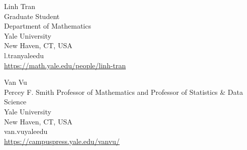 \documentclass{toc}
\begin{document}
			
			
			
			
			\begin{tocauthors}
				\begin{tocinfo}[tran]
					Linh Tran\\
					Graduate Student\\
					Department of Mathematics\\
					Yale University\\
					New Haven, CT, USA\\
					l.tran\tocat{}yale\tocdot{}edu \\   %
					\url{https://math.yale.edu/people/linh-tran}      %
				\end{tocinfo}
				\begin{tocinfo}[vu]
					Van Vu\\
					Percey F. Smith Professor of Mathematics and Professor of Statistics \& Data Science\\
					Yale University\\
					New Haven, CT, USA\\
					van.vu\tocat{}yale\tocdot{}edu \\   %
					\url{https://campuspress.yale.edu/vanvu/}      %
				\end{tocinfo}
			\end{tocauthors}
			
\end{document}
